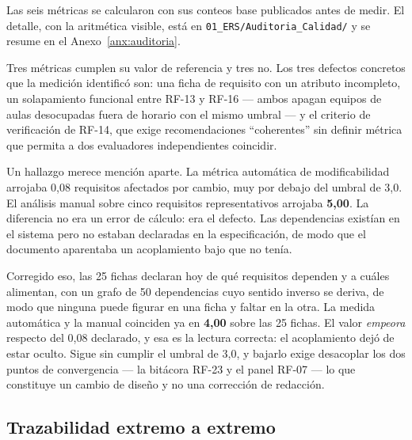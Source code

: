\documentclass[11pt,a4paper]{article}
\begin{document}
Las seis m\'etricas se calcularon con sus conteos base publicados antes de medir. El
detalle, con la aritm\'etica visible, est\'a en
\texttt{01\_ERS/Auditoria\_Calidad/} y se resume en el Anexo~\ref{anx:auditoria}.

Tres m\'etricas cumplen su valor de referencia y tres no. Los tres defectos concretos
que la medici\'on identific\'o son: una ficha de requisito con un atributo incompleto, un
solapamiento funcional entre RF-13 y RF-16 --- ambos apagan equipos de aulas desocupadas
fuera de horario con el mismo umbral --- y el criterio de verificaci\'on de RF-14, que
exige recomendaciones \enquote{coherentes} sin definir m\'etrica que permita a dos
evaluadores independientes coincidir.

Un hallazgo merece menci\'on aparte. La m\'etrica autom\'atica de modificabilidad
arrojaba 0,08 requisitos afectados por cambio, muy por debajo del umbral de 3,0. El
an\'alisis manual sobre cinco requisitos representativos arrojaba \textbf{5,00}. La
diferencia no era un error de c\'alculo: era el defecto. Las dependencias exist\'ian en el
sistema pero no estaban declaradas en la especificaci\'on, de modo que el documento
aparentaba un acoplamiento bajo que no ten\'ia.

Corregido eso, las 25 fichas declaran hoy de qu\'e requisitos dependen y a cu\'ales
alimentan, con un grafo de 50 dependencias cuyo sentido inverso se deriva, de modo que
ninguna puede figurar en una ficha y faltar en la otra. La medida autom\'atica y la manual
coinciden ya en \textbf{4,00} sobre las 25 fichas. El valor \emph{empeora} respecto del
0,08 declarado, y esa es la lectura correcta: el acoplamiento dej\'o de estar oculto. Sigue
sin cumplir el umbral de 3,0, y bajarlo exige desacoplar los dos puntos de convergencia
--- la bit\'acora RF-23 y el panel RF-07 --- lo que constituye un cambio de dise\~no y no
una correcci\'on de redacci\'on.

\subsection{Trazabilidad extremo a extremo}
\end{document}
